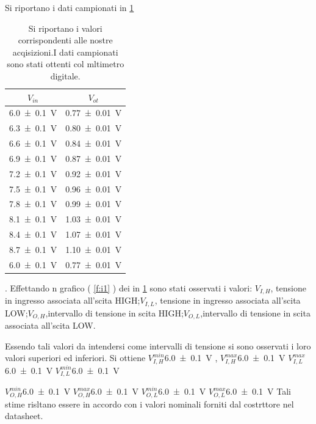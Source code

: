 	Si riportano i dati campionati in \tablename{ \ref{t:1}}
		\begin{table}[hb]
		\centering
		\begin{tabular}{|c|c|}
			\toprule
			$V_{in}$  & 	$V_{ot}$ \\
			\midrule
			\SI{6.0 \pm 0.1}{\volt} & \SI{0.77 \pm 0.01}{\volt}\\
			\SI{6.3 \pm 0.1}{\volt} & \SI{0.80 \pm 0.01}{\volt}\\
			\SI{6.6 \pm 0.1}{\volt} & \SI{0.84 \pm 0.01}{\volt}\\
			\SI{6.9 \pm 0.1}{\volt} & \SI{0.87 \pm 0.01}{\volt}\\
			\SI{7.2 \pm 0.1}{\volt} & \SI{0.92 \pm 0.01}{\volt}\\
			\SI{7.5 \pm 0.1}{\volt} & \SI{0.96 \pm 0.01}{\volt}\\
			\SI{7.8 \pm 0.1}{\volt} & \SI{0.99 \pm 0.01}{\volt}\\
			\SI{8.1 \pm 0.1}{\volt} & \SI{1.03 \pm 0.01}{\volt}\\
			\SI{8.4 \pm 0.1}{\volt} & \SI{1.07 \pm 0.01}{\volt}\\
			\SI{8.7 \pm 0.1}{\volt} & \SI{1.10 \pm 0.01}{\volt}\\
			\SI{6.0 \pm 0.1}{\volt} & \SI{0.77 \pm 0.01}{\volt}\\
			\bottomrule
		\end{tabular}
		\caption{Si riportano i valori corrispondenti alle nostre acqisizioni.I dati campionati sono stati ottenti col mltimetro digitale.}
		\label{t:1}
	\end{table}
	.
	Effettando n grafico  ( \figurename{ \ref{f:i1}} )
	 dei in  \tablename{ \ref{t:1}} sono stati osservati i valori:
	 $V_{I,H}$, tensione in ingresso associata all'scita HIGH;$V_{I,L}$, tensione in ingresso associata all'scita LOW;$V_{O,H}$,intervallo di tensione in scita   HIGH;$V_{O,L}$,intervallo di tensione in scita associata all'scita LOW.
	 
	 Essendo tali valori da intendersi come intervalli di tensione si sono osservati i loro valori superiori ed inferiori.
	 Si ottiene $V_{I,H}^{min}$\SI{6.0 \pm 0.1}{\volt} ,
	 			$V_{I,H}^{max}$\SI{6.0 \pm 0.1}{\volt}
	 			$V_{I,L}^{max}$\SI{6.0 \pm 0.1}{\volt}
	 			$V_{I,L}^{min}$\SI{6.0 \pm 0.1}{\volt}
	 			
	 			$V_{O,H}^{min}$\SI{6.0 \pm 0.1}{\volt}
	 			$V_{O,H}^{max}$\SI{6.0 \pm 0.1}{\volt}
	 			$V_{O,L}^{min}$\SI{6.0 \pm 0.1}{\volt}
	 			$V_{O,L}^{max}$\SI{6.0 \pm 0.1}{\volt}
	 Tali stime risltano essere in accordo con i valori
	 nominali forniti dal costrttore nel datasheet.
	 
